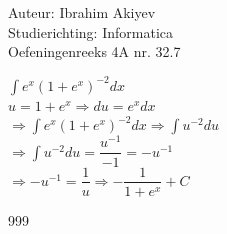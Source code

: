 \documentclass[a4paper]{article}
\begin{document}
\noindent \large Auteur: Ibrahim Akiyev \\
\noindent \large Studierichting: Informatica\\
\noindent \large Oefeningenreeks 4A nr. 32.7\\

\medskip

\normalsize

$\displaystyle\int e^x (1+e^x)^{-2} dx $\\

$u = 1 + e^x \Rightarrow du = e^x dx$\\

$\Rightarrow\displaystyle\int e^x (1+e^x)^{-2} dx \Rightarrow \int u^{-2}du $\\

$\Rightarrow\displaystyle\int u^{-2}du = \dfrac{u^{-1}}{-1} = -u^{-1} $\\

$\Rightarrow -u^{-1} = \dfrac{1}{u} \Rightarrow -\dfrac{1}{1 + e^x} + C$\\

\begin{thebibliography}{999}
\end{thebibliography}
\end{document}
